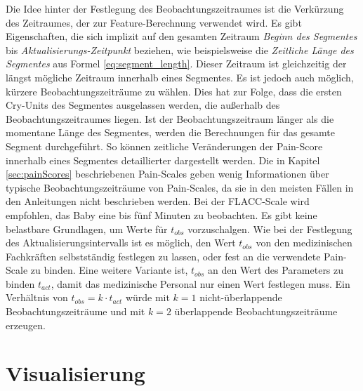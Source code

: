 Die Idee hinter der Festlegung des Beobachtungszeitraumes ist die Verkürzung des Zeitraumes, der zur Feature-Berechnung verwendet wird. Es gibt Eigenschaften, die sich implizit auf den gesamten Zeitraum \emph{Beginn des Segmentes} bis \emph{Aktualisierungs-Zeitpunkt} beziehen, wie beispielsweise die \emph{Zeitliche Länge des Segmentes} aus Formel \ref{eq:segment_length}. Dieser Zeitraum ist gleichzeitig der längst mögliche Zeitraum innerhalb eines Segmentes. Es ist jedoch auch möglich, kürzere Beobachtungszeiträume zu wählen. Dies hat zur Folge, dass die ersten Cry-Units des Segmentes ausgelassen werden, die außerhalb des Beobachtungszeitraumes liegen. Ist der Beobachtungszeitraum länger als die momentane Länge des Segmentes, werden die Berechnungen für das gesamte Segment durchgeführt. So können zeitliche Veränderungen der Pain-Score innerhalb eines Segmentes detaillierter dargestellt werden. Die in Kapitel \ref{sec:painScores} beschriebenen Pain-Scales geben wenig Informationen über \glqq typische Beobachtungszeiträume von Pain-Scales\grqq{}, da sie in den meisten Fällen in den Anleitungen nicht beschrieben werden. Bei der FLACC-Scale wird empfohlen, das Baby eine bis fünf Minuten zu beobachten.\cite{flacc} Es gibt keine belastbare Grundlagen, um Werte für $t_{obs}$ vorzuschalgen. Wie bei der Festlegung des Aktualisierungsintervalls ist es möglich, den Wert $t_{obs}$ von den medizinischen Fachkräften selbstständig festlegen zu lassen, oder fest an die verwendete Pain-Scale zu binden. Eine weitere Variante ist, $t_{obs}$ an den Wert des Parameters zu binden $t_{act}$, damit das medizinische Personal nur einen Wert festlegen muss. Ein Verhältnis von $t_{obs} = k \cdot t_{act}$ würde mit $k=1$ nicht-überlappende Beobachtungszeiträume und  mit $k=2$ überlappende Beobachtungszeiträume erzeugen.

\section{Visualisierung}
\label{sec:visualisation}